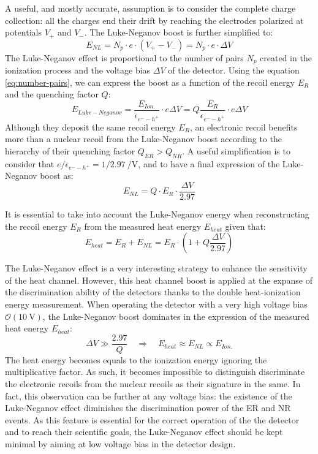 A useful, and mostly accurate, assumption is to consider the complete charge collection: all the charges end their drift by reaching the electrodes polarized at potentials $V_+$ and $V_-$. The Luke-Neganov boost is further simplified to:
\begin{equation}
E_{NL} = N_p \cdot e \cdot (V_+ - V_-) = N_p \cdot e \cdot \Delta V
\end{equation}
The Luke-Neganov effect is proportional to the number of pairs $N_p$ created in the ionization process and the voltage bias $\Delta V$ of the detector. Using the equation \ref{eq:number-pairs}, we can express the boost as a function of the recoil energy $E_R$ and the quenching factor $Q$:
\begin{equation}
E_{Luke-Neganov} = \frac{E_{Ion.}}{\epsilon_{e^--h^+}} \cdot e \Delta V = Q \frac{E_R}{\epsilon_{e^--h^+}} \cdot e \Delta V
\end{equation}
Although they deposit the same recoil energy $E_R$, an electronic recoil benefits more than a nuclear recoil from the Luke-Neganov boost according to the hierarchy of their quenching factor $Q_{ER} > Q_{NR}$. 
A useful simplification is to consider that $e / \epsilon_{e^--h^+} = 1/2.97\ \si{\per\volt}$,  and to have a final expression of the Luke-Neganov boost as:
\begin{equation}
\label{eq:nl-boost}
E_{NL} = Q \cdot E_R \cdot \frac{\Delta V}{2.97}
\end{equation}

It is essential to take into account the Luke-Neganov energy when reconstructing the recoil energy $E_R$ from the measured heat energy $E_{heat}$ given that:
\begin{equation}
E_{heat} = E_R + E_{NL} = E_R \cdot \left( 1 + Q \frac{\Delta V}{2.97} \right)
\end{equation}

The Luke-Neganov effect is a very interesting strategy to enhance the sensitivity of the heat channel. However, this heat channel boost is applied at the expanse of the discrimination ability of the detectors thanks to the double heat-ionization energy measurement. When operating the detector with a very high voltage bias $\mathcal{O}(\SI{10}{\volt})$, the Luke-Neganov boost dominates in the expression of the measured heat energy $E_{heat}$:
\begin{equation}
\Delta V \gg \frac{2.97}{Q}
\quad \Rightarrow \quad
E_{heat} \approx E_{NL} \propto E_{Ion.}
\end{equation}
The heat energy becomes equals to the ionization energy ignoring the multiplicative factor. As such, it becomes impossible to distinguish discriminate the electronic recoils from the nuclear recoils as their signature in the same. In fact, this observation can be further at any voltage bias: the existence of the Luke-Neganov effect diminishes the discrimination power of the ER and NR events. As this feature is essential for the correct operation of the the detector and to reach their scientific goals, the Luke-Neganov effect should be kept minimal by aiming at low voltage bias in the detector design.

